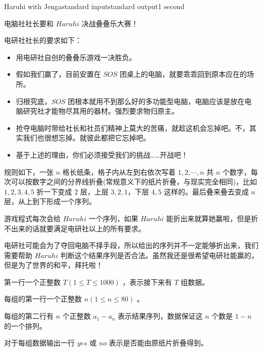 \begin{problem}{Haruhi with Jenga}{standard input}{standard output}{1 second}

电脑社社长要和 $Haruhi$ 决战叠叠乐大赛！

电研社社长的要求如下：

\begin{itemize}
\item 用电研社自创的叠叠乐游戏一决胜负。
\item 假如我们赢了，目前安置在 $SOS$ 团桌上的电脑，就要乖乖回到原本应在的场所。
\item 归根究底，$SOS$ 团根本就用不到那么好的多功能型电脑，电脑应该是放在电脑研究社才能物尽其用的器材。强烈要求物归原主。
\item 抢夺电脑时带给社长和社员们精神上莫大的苦痛，就趁这机会忘掉吧。不，其实我们也很想忘掉。就彼此都把它忘掉吧。
\item 基于上述的理由，你们必须接受我们的挑战……开战吧！
\end{itemize}

规则如下，一张 $n$ 格长纸条，格子内从左到右依次写着 $1,2,\cdots,n$ 共 $n$ 个数字，每次可以按数字之间的分界线折叠(常规意义下的纸片折叠，与现实完全相同)，比如 $1,2,3,4,5$ 折一下变成 $2$ 层，上层 $3,2,1$，下层 $4,5$ 这样的。最后叠来叠去变成 $n$ 层，从上到下形成一个序列。

游戏程式每次会给 $Haruhi$ 一个序列，如果 $Haruhi$ 能折出来就算她赢啦，但是折不出来的话就要满足电研社以上的所有要求。

电研社可能会为了夺回电脑不择手段，所以给出的序列并不一定能够折出来，我们需要帮助 $Haruhi$ 判断这个结果序列是否合法。虽然我还是很希望电研社能赢的，但是为了世界的和平，拜托啦！



\InputFile

第一行一个正整数 $T(1 \leq T \leq 1000)$ ，表示接下来有 $T$ 组数据。

每组的第一行一个正整数 $n(1 \leq n \leq 80)$ 。

每组的第二行有 $n$ 个正整数 $a_1-a_n$ 表示结果序列，数据保证这 $n$ 个数是 $1-n$ 的一个排列。

\OutputFile

对于每组数据输出一行 $yes$ 或 $no$ 表示是否能由原纸片折叠得到。

\Example
\begin{example}
%
\end{example}


\end{problem}
